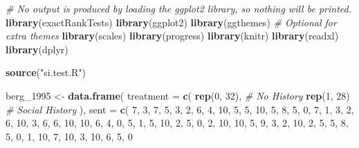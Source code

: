 \documentclass[
]{article}
\newenvironment{Shaded}{\begin{snugshade}}{\end{snugshade}}
\newcommand{\AttributeTok}[1]{\textcolor[rgb]{0.13,0.29,0.53}{#1}}
\newcommand{\CommentTok}[1]{\textcolor[rgb]{0.56,0.35,0.01}{\textit{#1}}}
\newcommand{\DecValTok}[1]{\textcolor[rgb]{0.00,0.00,0.81}{#1}}
\newcommand{\FunctionTok}[1]{\textcolor[rgb]{0.13,0.29,0.53}{\textbf{#1}}}
\newcommand{\NormalTok}[1]{#1}
\newcommand{\OtherTok}[1]{\textcolor[rgb]{0.56,0.35,0.01}{#1}}
\newcommand{\StringTok}[1]{\textcolor[rgb]{0.31,0.60,0.02}{#1}}
\begin{document}
\begin{Shaded}
\begin{Highlighting}[]
\CommentTok{\# No output is produced by loading the ggplot2 library, so nothing will be printed.}
\FunctionTok{library}\NormalTok{(exactRankTests)}
\FunctionTok{library}\NormalTok{(ggplot2)}
\FunctionTok{library}\NormalTok{(ggthemes)   }\CommentTok{\# Optional for extra themes}
\FunctionTok{library}\NormalTok{(scales)}
\FunctionTok{library}\NormalTok{(progress) }
\FunctionTok{library}\NormalTok{(knitr)}
\FunctionTok{library}\NormalTok{(readxl)}
\FunctionTok{library}\NormalTok{(dplyr)}

\FunctionTok{source}\NormalTok{(}\StringTok{"si.test.R"}\NormalTok{)}

\NormalTok{berg\_1995 }\OtherTok{\textless{}{-}} \FunctionTok{data.frame}\NormalTok{(}
  \AttributeTok{treatment =} \FunctionTok{c}\NormalTok{(}
    \FunctionTok{rep}\NormalTok{(}\DecValTok{0}\NormalTok{, }\DecValTok{32}\NormalTok{),  }\CommentTok{\# No History}
    \FunctionTok{rep}\NormalTok{(}\DecValTok{1}\NormalTok{, }\DecValTok{28}\NormalTok{)   }\CommentTok{\# Social History}
\NormalTok{  ),}
  \AttributeTok{sent =} \FunctionTok{c}\NormalTok{(}
    \DecValTok{7}\NormalTok{, }\DecValTok{3}\NormalTok{, }\DecValTok{7}\NormalTok{, }\DecValTok{5}\NormalTok{, }\DecValTok{3}\NormalTok{, }\DecValTok{2}\NormalTok{, }\DecValTok{6}\NormalTok{, }\DecValTok{4}\NormalTok{, }\DecValTok{10}\NormalTok{, }\DecValTok{5}\NormalTok{, }\DecValTok{5}\NormalTok{, }\DecValTok{10}\NormalTok{, }\DecValTok{5}\NormalTok{, }\DecValTok{8}\NormalTok{, }\DecValTok{5}\NormalTok{, }\DecValTok{0}\NormalTok{, }\DecValTok{7}\NormalTok{, }\DecValTok{1}\NormalTok{, }\DecValTok{3}\NormalTok{, }\DecValTok{2}\NormalTok{, }\DecValTok{6}\NormalTok{, }\DecValTok{10}\NormalTok{, }\DecValTok{3}\NormalTok{, }\DecValTok{6}\NormalTok{, }\DecValTok{6}\NormalTok{, }\DecValTok{10}\NormalTok{, }\DecValTok{10}\NormalTok{, }\DecValTok{6}\NormalTok{, }\DecValTok{4}\NormalTok{, }\DecValTok{0}\NormalTok{, }\DecValTok{5}\NormalTok{, }\DecValTok{1}\NormalTok{,}
    \DecValTok{5}\NormalTok{, }\DecValTok{10}\NormalTok{, }\DecValTok{2}\NormalTok{, }\DecValTok{5}\NormalTok{, }\DecValTok{0}\NormalTok{, }\DecValTok{2}\NormalTok{, }\DecValTok{10}\NormalTok{, }\DecValTok{10}\NormalTok{, }\DecValTok{5}\NormalTok{, }\DecValTok{9}\NormalTok{, }\DecValTok{3}\NormalTok{, }\DecValTok{2}\NormalTok{, }\DecValTok{10}\NormalTok{, }\DecValTok{2}\NormalTok{, }\DecValTok{5}\NormalTok{, }\DecValTok{5}\NormalTok{, }\DecValTok{8}\NormalTok{, }\DecValTok{5}\NormalTok{, }\DecValTok{0}\NormalTok{, }\DecValTok{1}\NormalTok{, }\DecValTok{10}\NormalTok{, }\DecValTok{7}\NormalTok{, }\DecValTok{10}\NormalTok{, }\DecValTok{3}\NormalTok{, }\DecValTok{10}\NormalTok{, }\DecValTok{6}\NormalTok{, }\DecValTok{5}\NormalTok{, }\DecValTok{0}

\end{Highlighting}
\end{Shaded}
\end{document}
